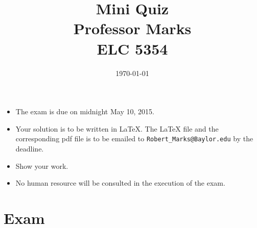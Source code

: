 \documentclass{article}[10pt]
\begin{document}
\title{Mini Quiz \\  Professor Marks \\ ELC 5354}

\date{\today}

\maketitle





\begin{itemize}
\item The exam is due on midnight May 10, 2015.
\item Your solution is to be written in \LaTeX. The \LaTeX
  file and the corresponding pdf file is to be emailed to \verb"Robert_Marks@Baylor.edu" by the deadline.
\item Show your work.
\item No human resource will be consulted in the execution of the exam.
\end{itemize}



\section{Exam}
\end{document}
